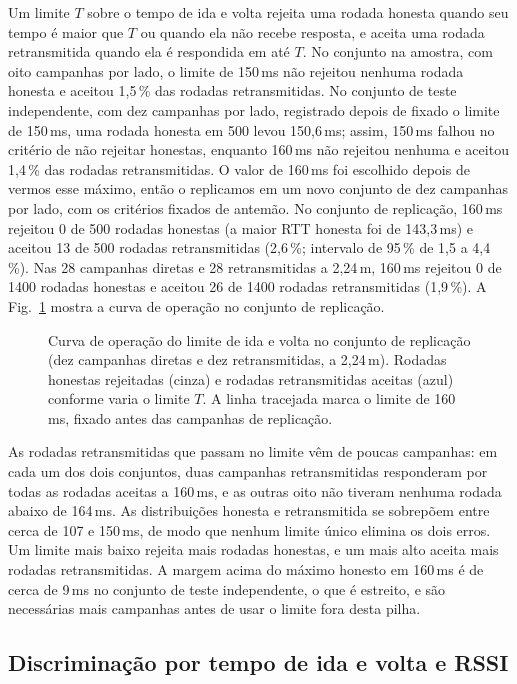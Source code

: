\documentclass{ieeeaccess}
\begin{document}
Um limite $T$ sobre o tempo de ida e volta rejeita uma rodada honesta quando seu tempo é maior que $T$ ou quando ela não recebe resposta, e aceita uma rodada retransmitida quando ela é respondida em até $T$. No conjunto na amostra, com oito campanhas por lado, o limite de 150\,ms não rejeitou nenhuma rodada honesta e aceitou 1,5\,\% das rodadas retransmitidas. No conjunto de teste independente, com dez campanhas por lado, registrado depois de fixado o limite de 150\,ms, uma rodada honesta em 500 levou 150,6\,ms; assim, 150\,ms falhou no critério de não rejeitar honestas, enquanto 160\,ms não rejeitou nenhuma e aceitou 1,4\,\% das rodadas retransmitidas. O valor de 160\,ms foi escolhido depois de vermos esse máximo, então o replicamos em um novo conjunto de dez campanhas por lado, com os critérios fixados de antemão. No conjunto de replicação, 160\,ms rejeitou 0 de 500 rodadas honestas (a maior RTT honesta foi de 143,3\,ms) e aceitou 13 de 500 rodadas retransmitidas (2,6\,\%; intervalo de 95\,\% de 1,5 a 4,4\,\%). Nas 28 campanhas diretas e 28 retransmitidas a 2,24\,m, 160\,ms rejeitou 0 de 1400 rodadas honestas e aceitou 26 de 1400 rodadas retransmitidas (1,9\,\%). A Fig.~\ref{fig:bound} mostra a curva de operação no conjunto de replicação.

\begin{figure}[t]
\centering

\caption{Curva de operação do limite de ida e volta no conjunto de replicação (dez campanhas diretas e dez retransmitidas, a 2,24\,m). Rodadas honestas rejeitadas (cinza) e rodadas retransmitidas aceitas (azul) conforme varia o limite $T$. A linha tracejada marca o limite de 160\,ms, fixado antes das campanhas de replicação.}
\label{fig:bound}
\end{figure}

As rodadas retransmitidas que passam no limite vêm de poucas campanhas: em cada um dos dois conjuntos, duas campanhas retransmitidas responderam por todas as rodadas aceitas a 160\,ms, e as outras oito não tiveram nenhuma rodada abaixo de 164\,ms. As distribuições honesta e retransmitida se sobrepõem entre cerca de 107 e 150\,ms, de modo que nenhum limite único elimina os dois erros. Um limite mais baixo rejeita mais rodadas honestas, e um mais alto aceita mais rodadas retransmitidas. A margem acima do máximo honesto em 160\,ms é de cerca de 9\,ms no conjunto de teste independente, o que é estreito, e são necessárias mais campanhas antes de usar o limite fora desta pilha.

\subsection{Discriminação por tempo de ida e volta e RSSI}
\label{sec:rssi}
\end{document}
